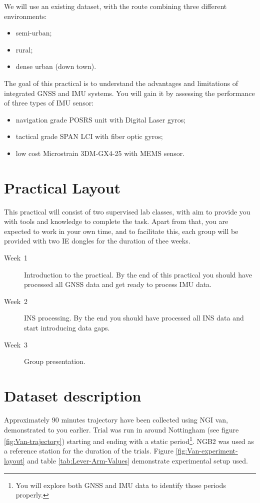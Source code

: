 \documentclass[11pt,fleqn]{book} %
\begin{document}
We will use an existing dataset, with the route combining three different environments:

\begin{itemize}
	\item semi-urban;
	\item rural;
	\item dense urban (down town).
\end{itemize}

The goal of this practical is to understand the advantages and limitations of integrated GNSS and IMU systems. You will gain it by assessing the performance of three types of IMU sensor:

\begin{itemize}
	\item navigation grade POSRS unit with Digital Laser gyros;
	\item tactical grade SPAN LCI with fiber optic gyros;
	\item low cost Microstrain 3DM-GX4-25 with MEMS sensor.
\end{itemize}

\newpage
\section{Practical Layout}

This practical will consist of two supervised lab classes, with aim to provide you with tools and knowledge to complete the task. Apart from that, you are expected to work in your own time, and to facilitate this, each group will be provided with two IE dongles for the duration of thee weeks.

\begin{description}
	\item [{Week~1}] Introduction to the practical. By the end of this practical you should
	have processed all GNSS data and get ready to process IMU data.
	\item [{Week~2}] INS processing. By the end you should have processed
	all INS data and start introducing data gaps.
	\item [{Week~3}] Group presentation.
\end{description}

\section{Dataset description}

Approximately 90 minutes trajectory have been collected using NGI van, demonstrated to you earlier. Trial was run in around Nottingham (see figure \ref{fig:Van-trajectory}) starting and ending with a static period\footnote{You will explore both GNSS and IMU data to identify those periods properly.}. NGB2 was used as a reference station for the duration of the trials.
Figure \ref{fig:Van-experiment-layout} and table \ref{tab:Lever-Arm-Values} demonstrate experimental setup used.
\end{document}
